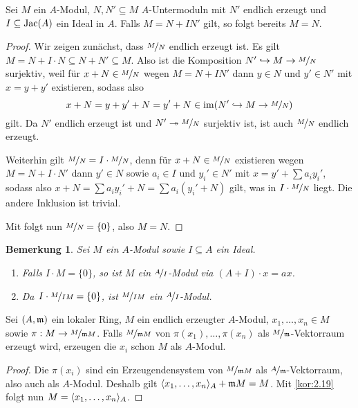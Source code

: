 \documentclass[12pt,a4paper]{scrartcl}
\theoremstyle{cplain}
\theoremstyle{cdef}
\newtheorem{beme}[thmcounter]{Bemerkung}
\begin{document}
\begin{kor} \label{kor:2.19}
	Sei $M$ ein $A$-Modul, $N,N' \subseteq M$ $A$-Untermoduln mit $N'$ endlich erzeugt und $I\subseteq \operatorname{Jac}(A)$ ein Ideal in $A$. Falls $M=N + IN'$ gilt, so folgt bereits $M=N$.
\end{kor}
\begin{proof}
	Wir zeigen zunächst, dass $\nicefrac{M}{N}$ endlich erzeugt ist. Es gilt $M=N+ I \cdot N \subseteq N+ N' \subseteq M$. Also ist die Komposition $N' \hookrightarrow M \to \nicefrac{M}{N}$ surjektiv, weil für $x+ N \in \nicefrac{M}{N}$ wegen $M=N+IN'$ dann $y\in N$ und $y' \in N'$ mit $x=y+y'$ existieren, sodass also \[x+N=y+y'+N = y' + N \in \operatorname{im}(N' \hookrightarrow M \to \nicefrac{M}{N}) \] gilt. Da $N'$ endlich erzeugt ist und $N' \twoheadrightarrow \nicefrac{M}{N}$ surjektiv ist, ist auch $\nicefrac{M}{N}$ endlich erzeugt.
	
	Weiterhin gilt $\nicefrac{M}{N} = I \cdot \nicefrac{M}{N}$, denn für $x+N \in \nicefrac{M}{N}$ existieren wegen $M=N+ I\cdot N'$ dann $y' \in N$ sowie $a_i \in I$ und $y_i' \in N'$ mit $x= y' + \sum a_iy_i'$, sodass also $x+ N = \sum a_iy_i' + N = \sum a_i(y_i' + N) $ gilt, was in $I \cdot \nicefrac{M}{N}$ liegt. Die andere Inklusion ist trivial.
	
	Mit  folgt nun $\nicefrac{M}{N} = \{0\}$, also $M=N$.
\end{proof}
\begin{beme}
	Sei $M$ ein $A$-Modul sowie $I \subseteq A$ ein Ideal.
	\begin{enumerate}
		\item Falls $I \cdot M = \{0\}$, so ist $M$ ein $\nicefrac{A}{I}$-Modul via $(A+I) \cdot x = ax$.
		\item Da $I \cdot \nicefrac{M}{I M} = \{0\}$, ist $\nicefrac{M}{IM}$ ein $\nicefrac{A}{I}$-Modul.
	\end{enumerate}
\end{beme}
\begin{kor}
	Sei $(A,\mathfrak{m})$ ein lokaler Ring, $M$ ein endlich erzeugter $A$-Modul, $x_1,\ldots,x_n \in M$ sowie $\pi: M \to \nicefrac{M}{\mathfrak{m} M}$. Falls $\nicefrac{M}{\mathfrak{m} M}$ von $\pi(x_1),\ldots,\pi(x_n)$ als $\nicefrac{M}{\mathfrak{m}}$-Vektorraum erzeugt wird, erzeugen die $x_i$ schon $M$ als $A$-Modul.
\end{kor}
\begin{proof}
	Die $\pi(x_i)$ sind ein Erzeugendensystem von $\nicefrac{M}{\mathfrak{m} M}$ als $\nicefrac{A}{\mathfrak{m}}$-Vektorraum, also auch als $A$-Modul. Deshalb gilt $\langle x_1,\ldots,x_n\rangle_A + \mathfrak{m} M = M$. Mit \cref{kor:2.19} folgt nun $M= \langle x_1,\ldots,x_n\rangle_A$.
\end{proof}
\end{document}
